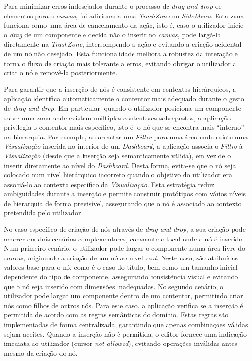 Para minimizar erros indesejados durante o processo de \textit{drag-and-drop} de elementos para o \textit{canvas}, foi adicionada uma \textit{TrashZone} no \textit{SideMenu}. Esta zona funciona como uma área de cancelamento da ação, isto é, caso o utilizador inicie o \textit{drag} de um componente e decida não o inserir no \textit{canvas}, pode largá-lo diretamente na \textit{TrashZone}, interrompendo a ação e evitando a criação acidental de um nó não desejado. Esta funcionalidade melhora a robustez da interação e torna o fluxo de criação mais tolerante a erros, evitando obrigar o utilizador a criar o nó e removê-lo posteriormente.

Para garantir que a inserção de nós é consistente em contextos hierárquicos, a aplicação identifica automaticamente o contentor mais adequado durante o gesto de \textit{drag-and-drop}. Em particular, quando o utilizador posiciona um componente sobre uma zona onde existem múltiplos contentores sobrepostos, a aplicação privilegia o contentor mais específico, isto é, o nó que se encontra mais ``interno'' na hierarquia. Por exemplo, ao arrastar um \textit{Filtro} para uma área onde existe uma \textit{Visualização} inserida no interior de um \textit{Dashboard}, a aplicação associa o \textit{Filtro} à \textit{Visualização} (desde que a inserção seja semanticamente válida), em vez de o inserir diretamente ao nível do \textit{Dashboard}. Desta forma, evita-se que o nó seja colocado num nível hierárquico incorreto quando o objetivo do utilizador era associá-lo ao contexto específico da \textit{Visualização}. Esta estratégia reduz ambiguidades durante a inserção e permite construir protótipos com vários níveis de hierarquia de forma previsível, assegurando que o nó é associado ao contexto pretendido pelo utilizador.

No caso específico de criação de nós através de \textit{drag-and-drop}, a sua criação pode ocorrer em dois cenários complementares, consoante o local onde o nó é inserido. Num primeiro cenário, o utilizador pode largar o componente numa área livre do \textit{canvas}, originando a criação de um nó ao nível \textit{root}. Neste caso, são atribuídos valores base para o nó, como é o caso do título, bem como um tamanho inicial dependente do tipo de componente, assegurando consistência visual e evitando que o nó seja inserido com dimensões inadequadas. No segundo cenário, o utilizador pode largar um componente dentro de um contentor, permitindo criar nós como filhos de outros nós. Para este caso, a aplicação verifica se a inserção é permitida de acordo com as regras semânticas do domínio. Estas regras são implementadas de forma centralizada, garantindo que apenas combinações válidas sejam aceites. Quando a inserção não é permitida, o editor fornece uma indicação imediata ao utilizador (cursor \textit{not-allowed}), evitando operações inválidas antes mesmo da criação do nó.

